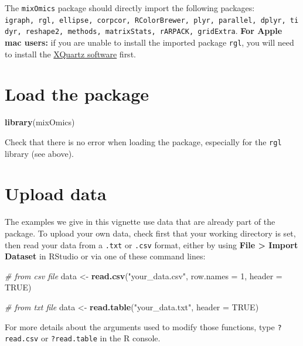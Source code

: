 \documentclass[]{book}
\newenvironment{Shaded}{\begin{snugshade}}{\end{snugshade}}
\newcommand{\CommentTok}[1]{\textcolor[rgb]{0.56,0.35,0.01}{\textit{#1}}}
\newcommand{\DataTypeTok}[1]{\textcolor[rgb]{0.13,0.29,0.53}{#1}}
\newcommand{\DecValTok}[1]{\textcolor[rgb]{0.00,0.00,0.81}{#1}}
\newcommand{\KeywordTok}[1]{\textcolor[rgb]{0.13,0.29,0.53}{\textbf{#1}}}
\newcommand{\NormalTok}[1]{#1}
\newcommand{\OtherTok}[1]{\textcolor[rgb]{0.56,0.35,0.01}{#1}}
\newcommand{\StringTok}[1]{\textcolor[rgb]{0.31,0.60,0.02}{#1}}
\begin{document}
The \texttt{mixOmics} package should directly import the following packages:
\texttt{igraph,\ rgl,\ ellipse,\ corpcor,\ RColorBrewer,\ plyr,\ parallel,\ dplyr,\ tidyr,\ reshape2,\ methods,\ matrixStats,\ rARPACK,\ gridExtra}.
\textbf{For Apple mac users:} if you are unable to install the imported package \texttt{rgl}, you will need to install the \href{https://www.xquartz.org}{XQuartz software} first.

\hypertarget{start:upload}{%
\section{Load the package}\label{start:upload}}

\begin{Shaded}
\begin{Highlighting}[]
\KeywordTok{library}\NormalTok{(mixOmics)}
\end{Highlighting}
\end{Shaded}

Check that there is no error when loading the package, especially for the \texttt{rgl} library (see above).

\hypertarget{upload-data}{%
\section{Upload data}\label{upload-data}}

The examples we give in this vignette use data that are already part of the package. To upload your own data, check first that your working directory is set, then read your data from a \texttt{.txt} or \texttt{.csv} format, either by using \textbf{File \textgreater{} Import Dataset} in RStudio or via one of these command lines:

\begin{Shaded}
\begin{Highlighting}[]
\CommentTok{# from csv file}
\NormalTok{data <-}\StringTok{ }\KeywordTok{read.csv}\NormalTok{(}\StringTok{"your_data.csv"}\NormalTok{, }\DataTypeTok{row.names =} \DecValTok{1}\NormalTok{, }\DataTypeTok{header =} \OtherTok{TRUE}\NormalTok{)}

\CommentTok{# from txt file}
\NormalTok{data <-}\StringTok{ }\KeywordTok{read.table}\NormalTok{(}\StringTok{"your_data.txt"}\NormalTok{, }\DataTypeTok{header =} \OtherTok{TRUE}\NormalTok{)}
\end{Highlighting}
\end{Shaded}

For more details about the arguments used to modify those functions, type \texttt{?read.csv} or \texttt{?read.table} in the R console.
\end{document}
